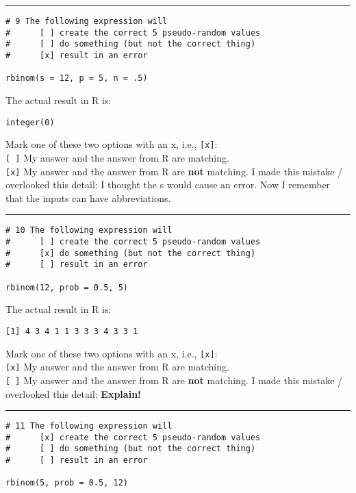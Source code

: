 \documentclass[12pt,letterpaper,final]{article}\usepackage[]{graphicx}\usepackage[]{xcolor}
\begin{document}
\begin{enumerate}
\hrule


\begin{verbatim}
# 9 The following expression will
#      [ ] create the correct 5 pseudo-random values
#      [ ] do something (but not the correct thing)
#      [x] result in an error

rbinom(s = 12, p = 5, n = .5)
\end{verbatim}

The actual result in R is: 
\begin{verbatim}
integer(0)
\end{verbatim}

Mark one of these two options with an x, i.e., \verb|[x]|: \\
\verb|[ ]| My answer and the answer from R are matching. \\
\verb|[x]| My answer and the answer from R are {\bf not} matching. 
I made this mistake / overlooked this detail: I thought the s would cause an error. 
Now I remember that the inputs can have abbreviations.\\


\hrule


\begin{verbatim}
# 10 The following expression will
#      [ ] create the correct 5 pseudo-random values
#      [x] do something (but not the correct thing)
#      [ ] result in an error

rbinom(12, prob = 0.5, 5)
\end{verbatim}

The actual result in R is: 
\begin{verbatim}
[1] 4 3 4 1 1 3 3 3 4 3 3 1
\end{verbatim}

Mark one of these two options with an x, i.e., \verb|[x]|: \\
\verb|[x]| My answer and the answer from R are matching. \\
\verb|[ ]| My answer and the answer from R are {\bf not} matching. 
I made this mistake / overlooked this detail: {\bf Explain!} \\


\hrule


\begin{verbatim}
# 11 The following expression will
#      [x] create the correct 5 pseudo-random values
#      [ ] do something (but not the correct thing)
#      [ ] result in an error

rbinom(5, prob = 0.5, 12)
\end{verbatim}


\end{enumerate}
\end{document}

